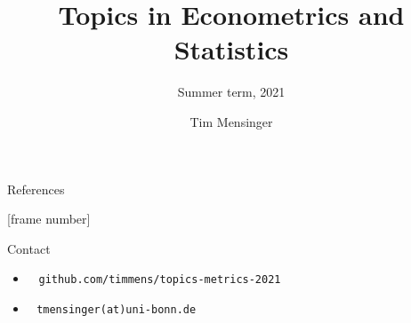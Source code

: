 \documentclass[serif, mathsansserif, aspectratio=169]{beamer}   %
\title{Topics in Econometrics and Statistics}
\subtitle{Summer term, 2021}
\author{Tim Mensinger}
\institute{University of Bonn}
\date{}
\begin{document}
\begin{frame}
    \maketitle
\end{frame}

\begin{frame}
  \tableofcontents
\end{frame}










\begin{frame}{References}
    \nocite{*}
    \printbibliography
\end{frame}

[frame number]{}  %
\begin{frame}{Contact}
    \begin{itemize}
        \item[] \large {} \,\,\, \texttt{github.com/timmens/topics-metrics-2021}
        \item[] \large {} \,\, \texttt{tmensinger(at)uni-bonn.de}
    \end{itemize}
\end{frame}
\end{document}
